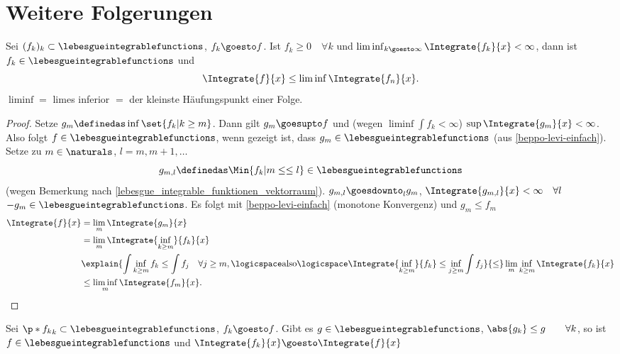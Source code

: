 \section*{Weitere Folgerungen}
\begin{satz}[Faton]
  Sei \( (f_k)_k\subset \lebesgueintegrablefunctions \), \( f_k\goesto f \). Ist \( f_k\geq 0\quad \forall k \) und \( \liminf_{k \goesto \infty}\Integrate{f_k}{x}<\infty \), dann ist \( f_k\in \lebesgueintegrablefunctions \) und 
  \begin{equation*}
    \Integrate{f}{x}\leq \liminf \Integrate{f_n}{x}.
  \end{equation*}
  \( \liminf= \) limes inferior \( = \) der kleinste Häufungspunkt einer Folge.
\end{satz}
\begin{proof}
  Setze \( g_m\definedas \inf\set{f_k|k\geq m} \). Dann gilt \( g_m\goesupto f \) und (wegen \( \liminf \int f_k<\infty \)) \( \sup \Integrate{g_m}{x}<\infty \). Also folgt \( f\in \lebesgueintegrablefunctions \), wenn gezeigt ist, dass \( g_m\in \lebesgueintegrablefunctions \) (aus \ref{beppo-levi-einfach}). Setze zu \( m\in \naturals \), \( l=m,m+1,\dotsc \) 
  \begin{equation*}
    g_{m,l}\definedas \Min{f_k|m\leq \leq l}\in \lebesgueintegrablefunctions
  \end{equation*}
  (wegen Bemerkung nach \ref{lebesgue_integrable_funktionen_vektorraum}). \( g_{m,l}\goesdownto_l g_m \), \( \Integrate{g_{m,l}}{x}<\infty \quad \forall l\) \timplies \( -g_m\in \lebesgueintegrablefunctions \). Es folgt mit \ref{beppo-levi-einfach} (monotone Konvergenz) und \( g_m\leq f_m \)
  \begin{align*}
    \Integrate{f}{x}&=\lim_m \Integrate{g_m}{x}\\
    &=\lim_m \Integrate{\inf_{k\geq m}}{f_k}{x}\\
    &\explain{\int{\inf_{k\geq m}{f_k}}\leq \int f_j\quad \forall j\geq m,\logicspace \text{also}\logicspace \Integrate{\inf_{k\geq m}}{f_k}\leq \inf_{j\geq m}\int f_j}{\leq}\lim_m \inf_{k\geq m}\Integrate{f_k}{x}\\
    &\leq \liminf_m \Integrate{f_m}{x}.
  \end{align*}
\end{proof}
\begin{satz}\label{majorisierte_konvergenz}
  Sei \( \p*{f_k}_k\subset \lebesgueintegrablefunctions \), \( f_k\goesto f \). Gibt es \( g\in \lebesgueintegrablefunctions \), \sd \( \abs{g_k}\leq g \qquad \forall k  \), so ist \( f\in \lebesgueintegrablefunctions \) und \( \Integrate{f_k}{x}\goesto \Integrate{f}{x} \)
\end{satz}
